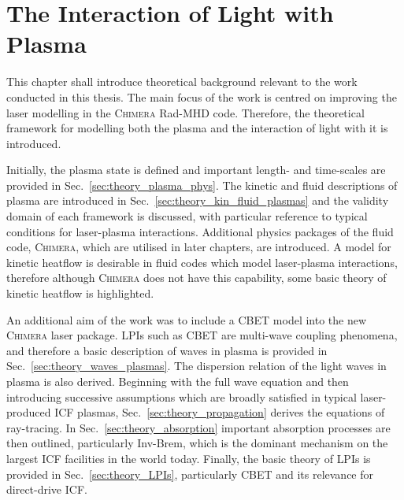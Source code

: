 \chapter{The Interaction of Light with Plasma}%
\label{chap:Theory}

This chapter shall introduce theoretical background relevant to the work conducted in this thesis.
The main focus of the work is centred on improving the laser modelling in the \textsc{Chimera} \ac{Rad-MHD} code.
Therefore, the theoretical framework for modelling both the plasma and the interaction of light with it is introduced.

Initially, the plasma state is defined and important length- and time-scales are provided in Sec.~\ref{sec:theory_plasma_phys}.
The kinetic and fluid descriptions of plasma are introduced in Sec.~\ref{sec:theory_kin_fluid_plasmas} and the validity domain of each framework is discussed, with particular reference to typical conditions for laser-plasma interactions.
Additional physics packages of the fluid code, \textsc{Chimera}, which are utilised in later chapters, are introduced.
A model for kinetic heatflow is desirable in fluid codes which model laser-plasma interactions, therefore although \textsc{Chimera} does not have this capability, some basic theory of kinetic heatflow is highlighted.

An additional aim of the work was to include a \ac{CBET} model into the new \textsc{Chimera} laser package.
\ac{LPIs} such as \ac{CBET} are multi-wave coupling phenomena, and therefore a basic description of waves in plasma is provided in Sec.~\ref{sec:theory_waves_plasmas}.
The dispersion relation of the light waves in plasma is also derived.
Beginning with the full wave equation and then introducing successive assumptions which are broadly satisfied in typical laser-produced \ac{ICF} plasmas, Sec.~\ref{sec:theory_propagation} derives the equations of ray-tracing.
In Sec.~\ref{sec:theory_absorption} important absorption processes are then outlined, particularly \ac{Inv-Brem}, which is the dominant mechanism on the largest \ac{ICF} facilities in the world today.
Finally, the basic theory of \ac{LPIs} is provided in Sec.~\ref{sec:theory_LPIs}, particularly \ac{CBET} and its relevance for direct-drive \ac{ICF}.

\newpage

